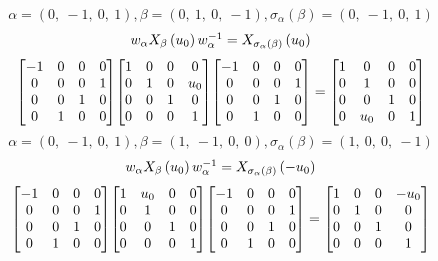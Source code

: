 \documentclass[11pt]{article}
\theoremstyle{definition}
\begin{document}
\[
\alpha = \left( 0, \  -1, \  0, \  1\right), \beta = \left( 0, \  1, \  0, \  -1\right), \sigma_{\alpha}(\beta) = \left( 0, \  -1, \  0, \  1\right)
\]
\[
\scaletoalign{\textwidth}{w_{\alpha} X_{\beta}\left(u_{0}\right) w_{\alpha}^{-1} = X_{\sigma_{\alpha}\left(\beta\right)}\left(u_{0}\right)}
\]
\[
\scaletoalign{\textwidth}{{\left[\begin{matrix}-1 & 0 & 0 & 0\\0 & 0 & 0 & 1\\0 & 0 & 1 & 0\\0 & 1 & 0 & 0\end{matrix}\right]} {\left[\begin{matrix}1 & 0 & 0 & 0\\0 & 1 & 0 & u_{0}\\0 & 0 & 1 & 0\\0 & 0 & 0 & 1\end{matrix}\right]} {\left[\begin{matrix}-1 & 0 & 0 & 0\\0 & 0 & 0 & 1\\0 & 0 & 1 & 0\\0 & 1 & 0 & 0\end{matrix}\right]} = {\left[\begin{matrix}1 & 0 & 0 & 0\\0 & 1 & 0 & 0\\0 & 0 & 1 & 0\\0 & u_{0} & 0 & 1\end{matrix}\right]}}
\]
\[
\alpha = \left( 0, \  -1, \  0, \  1\right), \beta = \left( 1, \  -1, \  0, \  0\right), \sigma_{\alpha}(\beta) = \left( 1, \  0, \  0, \  -1\right)
\]
\[
\scaletoalign{\textwidth}{w_{\alpha} X_{\beta}\left(u_{0}\right) w_{\alpha}^{-1} = X_{\sigma_{\alpha}\left(\beta\right)}\left(- u_{0}\right)}
\]
\[
\scaletoalign{\textwidth}{{\left[\begin{matrix}-1 & 0 & 0 & 0\\0 & 0 & 0 & 1\\0 & 0 & 1 & 0\\0 & 1 & 0 & 0\end{matrix}\right]} {\left[\begin{matrix}1 & u_{0} & 0 & 0\\0 & 1 & 0 & 0\\0 & 0 & 1 & 0\\0 & 0 & 0 & 1\end{matrix}\right]} {\left[\begin{matrix}-1 & 0 & 0 & 0\\0 & 0 & 0 & 1\\0 & 0 & 1 & 0\\0 & 1 & 0 & 0\end{matrix}\right]} = {\left[\begin{matrix}1 & 0 & 0 & - u_{0}\\0 & 1 & 0 & 0\\0 & 0 & 1 & 0\\0 & 0 & 0 & 1\end{matrix}\right]}}
\]
\end{document}
